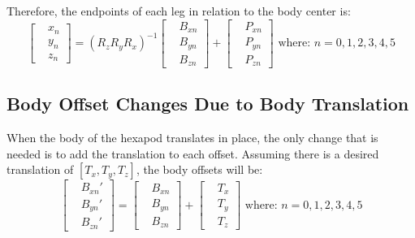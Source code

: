 \documentclass[12pt, letterpaper]{article}
\begin{document}
				Therefore, the endpoints of each leg in relation to the body center is:
				\begin{equation*}				
					\begin{bmatrix}
						&x_n \\
    					&y_n \\
    					&z_n
					\end{bmatrix}
					= (R_zR_yR_x)^{-1}
					\begin{bmatrix}
						&B_{xn} \\
    					&B_{yn} \\
    					&B_{zn}
					\end{bmatrix}
					+
					\begin{bmatrix}
						&P_{xn} \\
    					&P_{yn} \\
    					&P_{zn}
					\end{bmatrix}
					\text{ where: } n = 0,1,2,3,4,5
				\end{equation*}
			\subsection{Body Offset Changes Due to Body Translation}
				When the body of the hexapod translates in place, the only change that is needed is to add the translation to each offset. Assuming there is a desired translation of $[T_x, T_y, T_z]$, the body offsets will be:
				\begin{equation*}
					\begin{bmatrix}
						&B_{xn}' \\
    					&B_{yn}' \\
    					&B_{zn}'
					\end{bmatrix}
					=
					\begin{bmatrix}
						&B_{xn} \\
    					&B_{yn} \\
    					&B_{zn}
					\end{bmatrix}
					+
					\begin{bmatrix}
						&T_{x} \\
    					&T_{y} \\
    					&T_{z}
					\end{bmatrix}
					\text{ where: } n = 0,1,2,3,4,5
				\end{equation*}
		
\end{document}

